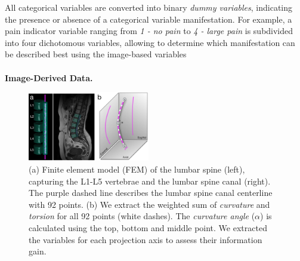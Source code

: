 \documentclass[a4paper,twoside]{style/article}
\begin{document}
All categorical variables are converted into binary \emph{dummy variables}, indicating the presence or absence of a categorical variable manifestation. %
For example, a pain indicator variable ranging from \emph{1 - no pain} to \emph{4 - large pain} is subdivided into four dichotomous variables, allowing to determine which manifestation can be described best using the image-based variables
\\\\
\noindent \textbf{Image-Derived Data.}
\begin{figure}[!t]
  \centering
  \includegraphics[width=0.475\textwidth]{figures/centerline}
  \caption{
	(a) Finite element model (FEM) of the lumbar spine (left), capturing the L1-L5 vertebrae and the lumbar spine canal (right).
	The purple dashed line describes the lumbar spine canal centerline with 92 points.
	(b) We extract the weighted sum of \emph{curvature} and \emph{torsion} for all 92 points (white dashes).
	The \emph{curvature angle} ($\alpha$) is calculated using the top, bottom and middle point.
	We extracted the variables for each projection axis to assess their information gain.
	}
  \label{fig:centerline}
\end{figure}
\end{document}
